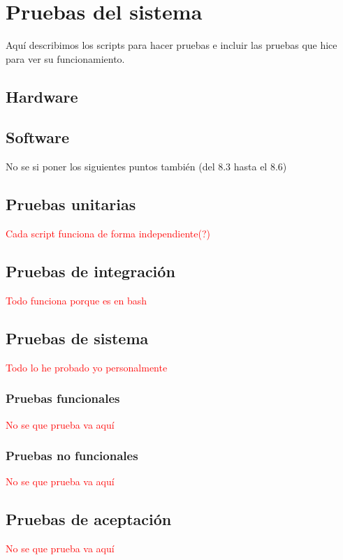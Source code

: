 \chapter{Pruebas del sistema}
Aquí describimos los scripts para hacer pruebas e incluir las pruebas que hice para ver su funcionamiento.

\section{Hardware}


\section{Software}

\begin{huge}
	No se si poner los siguientes puntos también (del 8.3 hasta el 8.6)
\end{huge}

\section{Pruebas unitarias}
\textcolor{red}{Cada script funciona de forma independiente(?)}

\section{Pruebas de integración}
\textcolor{red}{Todo funciona porque es en bash}

\section{Pruebas de sistema}
\textcolor{red}{Todo lo he probado yo personalmente}

\subsection{Pruebas funcionales}
\textcolor{red}{No se que prueba va aquí}

\subsection{Pruebas no funcionales}
\textcolor{red}{No se que prueba va aquí}

\section{Pruebas de aceptación}
\textcolor{red}{No se que prueba va aquí}